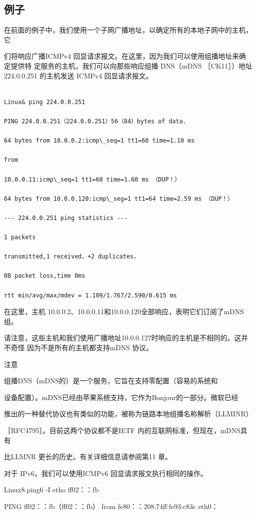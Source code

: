 \subsection{例子}
在前面的例子中，我们使用一个子网广播地址，以确定所有的本地子网中的主机，它

们将响应广播ICMPv4 回显请求报文。在这里，因为我们可以使用组播地址来确定提供特
定服务的主机，我们可以向那些响应组播 DNS（mDNS ［CK11］）地址224.0.0.251 的主机发送
ICMPv4 回显请求报文。

\begin{verbatim}
    
Linux& ping 224.0.0.251

PING 224.0.0.251（224.0.0.251）56（84）bytes of data.

64 bytes from 10.0.0.2:icmp\_seq=1 tt1=60 time=1.10 ms

from

10.0.0.11:icmp\_seq=1 tt1=60 time=1.60 ms （DUP！）

64 bytes from 10.0.0.120:icmp\_seg=1 tt1=64 time=2.59 ms （DUP！）

--- 224.0.0.251 ping statistics ---

1 packets

transmitted,1 received，+2 duplicates，

08 packet loss,time 0ms

rtt min/avg/max/mdev = 1.109/1.767/2.590/0.615 ms
\end{verbatim}

在这里，主机 10.0.0.2、10.0.0.11和10.0.0.120全部响应，表明它们订阅了mDNS组。

请注意，这些主机和我们使用广播地址10.0.0.127时响应的主机是不相同的。这并不奇怪
因为不是所有的主机都支持mDNS 协议。

注意

组播DNS（mDNS的）是一个服务，它旨在支持零配置（容易的系统和

设备配置）。mDNS已经由苹果系统支持，它作为Bonjour的一部分。微软已经

推出的一种替代协议也有类似的功能，被称为链路本地组播名称解析（LLMINR）

［RFC4795］。目前这两个协议都不是IETF 内的互联网标准，但现在，mDNS具有

比LLMNR 更长的历史。有关详细信息请参阅第11 章。

对于 IPv6，我们可以使用ICMPv6 回显请求报文执行相同的操作。

Linux8.ping6 -I etho ff02：：fb

PING ff02：：fb（ff02：：fb） from fe80：：208:74ff:fe93:c83c eth0：

